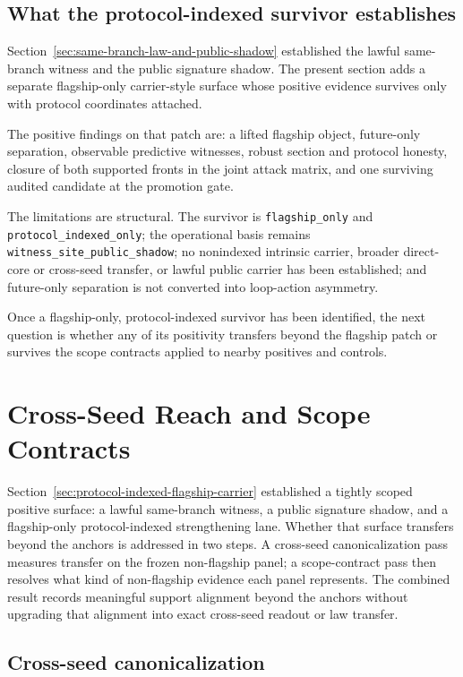 \documentclass[11pt]{article}
\theoremstyle{definition}
\begin{document}
\subsection{What the protocol-indexed survivor establishes}

Section~\ref{sec:same-branch-law-and-public-shadow} established the lawful same-branch
witness and the public signature shadow. The present section adds a separate
flagship-only carrier-style surface whose positive evidence survives only with
protocol coordinates attached.

The positive findings on that patch are: a lifted flagship object, future-only
separation, observable predictive witnesses, robust section and protocol honesty,
closure of both supported fronts in the joint attack matrix, and one surviving
audited candidate at the promotion gate.

The limitations are structural. The survivor is \texttt{flagship\_only} and
\texttt{protocol\_indexed\_only}; the operational basis remains
\texttt{witness\_site\_public\_shadow}; no nonindexed intrinsic carrier, broader
direct-core or cross-seed transfer, or lawful public carrier has been established; and
future-only separation is not converted into loop-action asymmetry.

Once a flagship-only, protocol-indexed survivor has been identified, the next question
is whether any of its positivity transfers beyond the flagship patch or survives the
scope contracts applied to nearby positives and controls.
 \section{Cross-Seed Reach and Scope Contracts}
\label{sec:cross-seed-reach-and-scope-contracts}

Section~\ref{sec:protocol-indexed-flagship-carrier} established a tightly scoped
positive surface: a lawful same-branch witness, a public signature shadow, and a
flagship-only protocol-indexed strengthening lane. Whether that surface transfers
beyond the anchors is addressed in two steps. A cross-seed canonicalization pass
measures transfer on the frozen non-flagship panel; a scope-contract pass then resolves
what kind of non-flagship evidence each panel represents. The combined result records
meaningful support alignment beyond the anchors without upgrading that alignment into
exact cross-seed readout or law transfer.

\subsection{Cross-seed canonicalization}
\end{document}

